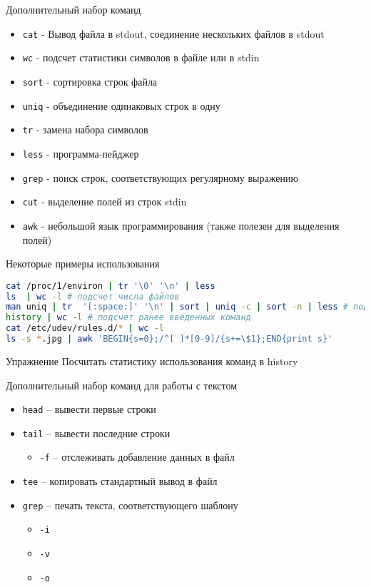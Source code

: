 \begin{frame}{Дополнительный набор команд}
  \begin{itemize}
    \item {\tt cat} - Вывод файла в stdout, соединение нескольких файлов в stdout
    \item {\tt wc} - подсчет статистики символов в файле или в stdin 
    \item {\tt sort} - сортировка строк файла
    \item {\tt uniq} - объединение одинаковых строк в одну
    \item {\tt tr} - замена набора символов
    \item {\tt less} - программа-пейджер
    \item {\tt grep} - поиск строк, соответствующих регулярному выражению
    \item {\tt cut} - выделение полей из строк stdin
    \item {\tt awk} - небольшой язык программирования (также полезен для выделения полей)
  \end{itemize}
\end{frame}

\begin{frame}[fragile]{Некоторые примеры использования}
\begin{lstlisting}[language=bash]
cat /proc/1/environ | tr '\0' '\n' | less
ls  | wc -l # подсчет числа файлов
man uniq | tr  '[:space:]' '\n' | sort | uniq -c | sort -n | less # подсчет количества слов в тексте man uniq
history | wc -l # подсчет ранее введенных команд
cat /etc/udev/rules.d/* | wc -l
ls -s *.jpg | awk 'BEGIN{s=0};/^[ ]*[0-9]/{s+=\$1};END{print s}' 
\end{lstlisting}
  \pause
  \begin{block}{Упражнение}
    Посчитать статистику использования команд в history
  \end{block}
\end{frame}

\begin{frame}{Дополнительный набор команд для работы с текстом}
	\begin{itemize}
	  \item {\tt head} -- вывести первые строки
	  \item {\tt tail} -- вывести последние строки
		\begin{itemize}
			\item {\tt -f} -- отслеживать добавление данных в файл 
		\end{itemize}
	  \item {\tt tee} -- копировать стандартный вывод в файл
	  \item {\tt grep} -- печать текста, соответствующего шаблону
		\begin{itemize}
			\item {\tt -i}	
			\item {\tt -v}
			\item {\tt -o}
		\end{itemize}
	\end{itemize}
\end{frame}

